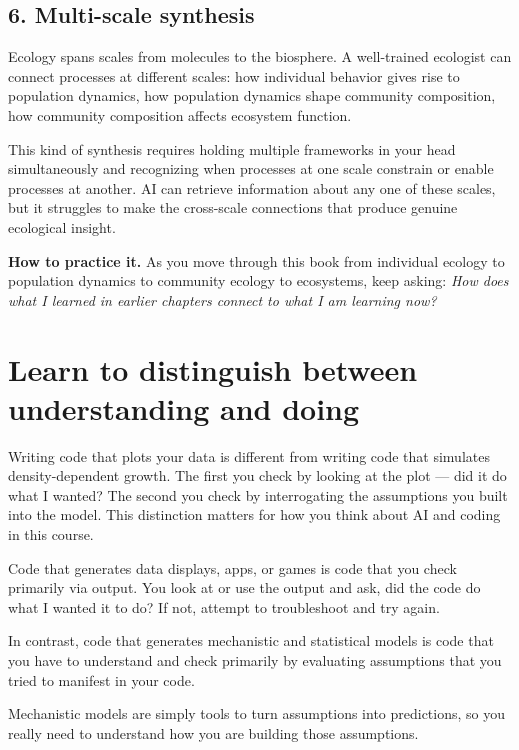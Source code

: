 \documentclass[
  letterpaper,
  DIV=11,
  numbers=noendperiod]{scrreprt}
\begin{document}
\subsection{6. Multi-scale synthesis}\label{multi-scale-synthesis}

Ecology spans scales from molecules to the biosphere. A well-trained
ecologist can connect processes at different scales: how individual
behavior gives rise to population dynamics, how population dynamics
shape community composition, how community composition affects ecosystem
function.

This kind of synthesis requires holding multiple frameworks in your head
simultaneously and recognizing when processes at one scale constrain or
enable processes at another. AI can retrieve information about any one
of these scales, but it struggles to make the cross-scale connections
that produce genuine ecological insight.

\textbf{How to practice it.} As you move through this book from
individual ecology to population dynamics to community ecology to
ecosystems, keep asking: \emph{How does what I learned in earlier
chapters connect to what I am learning now?}

\section{Learn to distinguish between understanding and
doing}\label{learn-to-distinguish-between-understanding-and-doing}

Writing code that plots your data is different from writing code that
simulates density-dependent growth. The first you check by looking at
the plot --- did it do what I wanted? The second you check by
interrogating the assumptions you built into the model. This distinction
matters for how you think about AI and coding in this course.

Code that generates data displays, apps, or games is code that you check
primarily via output. You look at or use the output and ask, did the
code do what I wanted it to do? If not, attempt to troubleshoot and try
again.

In contrast, code that generates mechanistic and statistical models is
code that you have to understand and check primarily by evaluating
assumptions that you tried to manifest in your code.

Mechanistic models are simply tools to turn assumptions into
predictions, so you really need to understand how you are building those
assumptions.
\end{document}
